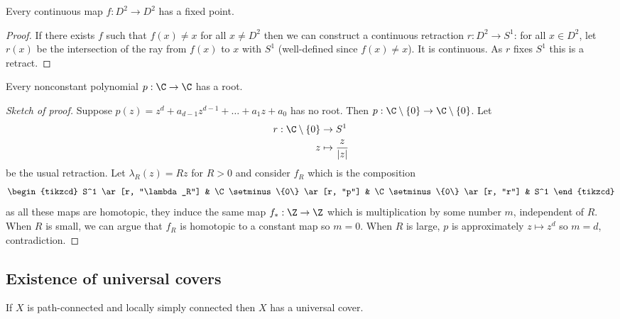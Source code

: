 \documentclass[a4paper]{article}
\begin{document}
\begin{corollary}
  Every continuous map \(f: D^2 \to D^2\) has a fixed point.
\end{corollary}

\begin{proof}
  If there exists \(f\) such that \(f(x) \neq x\) for all \(x \neq D^2\) then we can construct a continuous retraction \(r: D^2 \to S^1\): for all \(x \in D^2\), let \(r(x)\) be the intersection of the ray from \(f(x)\) to \(x\) with \(S^1\) (well-defined since \(f(x) \neq x\)). It is continuous. As \(r\) fixes \(S^1\) this is a retract.
\end{proof}

\begin{theorem}
  Every nonconstant polynomial \(p: \C \to \C\) has a root.
\end{theorem}

\begin{proof}[Sketch of proof]
  Suppose \(p(z) = z^d + a_{d - 1} z^{d - 1} + \dots + a_1 z + a_0\) has no root. Then \(p: \C \setminus \{0\} \to \C \setminus \{0\}\). Let
  \begin{align*}
    r: \C \setminus \{0\} &\to S^1 \\
    z &\mapsto \frac{z}{|z|}
  \end{align*}
  be the usual retraction. Let \(\lambda_R(z) = Rz\) for \(R > 0\) and consider \(f_R\) which is the composition
  \[
    \begin{tikzcd}
      S^1 \ar[r, "\lambda_R"] & \C \setminus \{0\} \ar[r, "p"] & \C \setminus \{0\} \ar[r, "r"] & S^1
    \end{tikzcd}
  \]
  as all these maps are homotopic, they induce the same map \(f_*: \Z \to \Z\) which is multiplication by some number \(m\), independent of \(R\). When \(R\) is small, we can argue that \(f_R\) is homotopic to a constant map so \(m = 0\). When \(R\) is large, \(p\) is approximately \(z \mapsto z^d\) so \(m = d\), contradiction.
\end{proof}

\subsection{Existence of universal covers}

\begin{theorem}
  If \(X\) is path-connected and locally simply connected then \(X\) has a universal cover.
\end{theorem}
\end{document}
